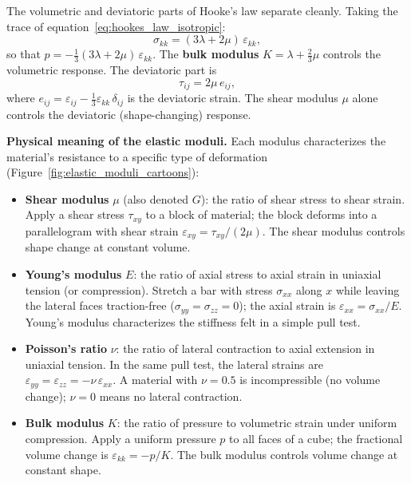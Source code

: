 \documentclass[11pt]{article}
\begin{document}
\medskip
\noindent The volumetric and deviatoric parts of Hooke's law separate cleanly.  Taking the trace of equation~\eqref{eq:hookes_law_isotropic}:
\begin{equation}
  \sigma_{kk} = (3\lambda + 2\mu)\,\varepsilon_{kk},
  \label{eq:volumetric}
\end{equation}
so that $p = -\frac{1}{3}(3\lambda + 2\mu)\,\varepsilon_{kk}$.  The \textbf{bulk modulus} $K = \lambda + \frac{2}{3}\mu$ controls the volumetric response.  The deviatoric part is
\begin{equation}
  \tau_{ij} = 2\mu\,e_{ij},
  \label{eq:deviatoric_hooke}
\end{equation}
where $e_{ij} = \varepsilon_{ij} - \frac{1}{3}\varepsilon_{kk}\,\delta_{ij}$ is the deviatoric strain.  The shear modulus $\mu$ alone controls the deviatoric (shape-changing) response.

\medskip
\noindent\textbf{Physical meaning of the elastic moduli.}  Each modulus characterizes the material's resistance to a specific type of deformation (Figure~\ref{fig:elastic_moduli_cartoons}):
\begin{itemize}
  \item \textbf{Shear modulus} $\mu$ (also denoted $G$): the ratio of shear stress to shear strain.  Apply a shear stress $\tau_{xy}$ to a block of material; the block deforms into a parallelogram with shear strain $\varepsilon_{xy} = \tau_{xy}/(2\mu)$.  The shear modulus controls shape change at constant volume.

  \item \textbf{Young's modulus} $E$: the ratio of axial stress to axial strain in uniaxial tension (or compression).  Stretch a bar with stress $\sigma_{xx}$ along $x$ while leaving the lateral faces traction-free ($\sigma_{yy} = \sigma_{zz} = 0$); the axial strain is $\varepsilon_{xx} = \sigma_{xx}/E$.  Young's modulus characterizes the stiffness felt in a simple pull test.

  \item \textbf{Poisson's ratio} $\nu$: the ratio of lateral contraction to axial extension in uniaxial tension.  In the same pull test, the lateral strains are $\varepsilon_{yy} = \varepsilon_{zz} = -\nu\,\varepsilon_{xx}$.  A material with $\nu = 0.5$ is incompressible (no volume change); $\nu = 0$ means no lateral contraction.

  \item \textbf{Bulk modulus} $K$: the ratio of pressure to volumetric strain under uniform compression.  Apply a uniform pressure $p$ to all faces of a cube; the fractional volume change is $\varepsilon_{kk} = -p/K$.  The bulk modulus controls volume change at constant shape.
\end{itemize}
\end{document}
